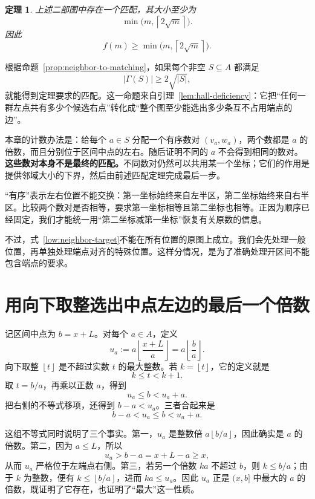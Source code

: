 \documentclass[UTF8,a4paper,oneside,openany,fontset=fandol,zihao=-4]{ctexbook}
\theoremstyle{guide}
\newtheorem{theorem}{定理}[chapter]
\newcommand{\ceil}[1]{\left\lceil#1\right\rceil}
\newcommand{\floor}[1]{\left\lfloor#1\right\rfloor}
\begin{document}
\begin{theorem}\label{low:main}
上述二部图中存在一个匹配，其大小至少为
\[
  \min\bigl(m,\ceil{2\sqrt m}\bigr).
\]
因此
\[
  f(m)\geq\min\bigl(m,\ceil{2\sqrt m}\bigr).
\]
\end{theorem}

根据命题~\ref{prop:neighbor-to-matching}，如果每个非空 $S\subseteq A$ 都满足
\begin{equation}\label{low:neighbor-target}
  |\Gamma(S)|\geq 2\sqrt{|S|},
\end{equation}
就能得到定理要求的匹配。这一命题来自引理~\ref{lem:hall-deficiency}：它把“任何一群左点共有多少个候选右点”转化成“整个图至少能选出多少条互不占用端点的边”。

本章的计数办法是：给每个 $a\in S$ 分配一个有序数对 $(v_a,w_a)$，两个数都是 $a$ 的倍数，而且分别位于区间中点的左右。随后证明不同的 $a$ 不会得到相同的数对。\textbf{这些数对本身不是最终的匹配。}不同数对仍然可以共用某一个坐标；它们的作用是提供邻域大小的下界，然后由前述匹配定理完成最后一步。

“有序”表示左右位置不能交换：第一坐标始终来自左半区，第二坐标始终来自右半区。比较两个数对是否相等，要求第一坐标相等且第二坐标也相等。正因为顺序已经固定，我们才能统一用“第二坐标减第一坐标”恢复有关原数的信息。

不过，式~\eqref{low:neighbor-target}不能在所有位置的原图上成立。我们会先处理一般位置，再单独处理端点对齐的特殊位置。这样分情况，是为了准确处理开区间不能包含端点的要求。

\section{用向下取整选出中点左边的最后一个倍数}

记区间中点为 $b=x+L$。对每个 $a\in A$，定义
\begin{equation}\label{low:floor-choice}
  u_a:=a\floor{\frac{x+L}{a}}=a\floor{\frac ba}.
\end{equation}
向下取整 $\floor t$ 是不超过实数 $t$ 的最大整数。若 $k=\floor t$，它的定义就是
\[
  k\leq t<k+1.
\]
取 $t=b/a$，再乘以正数 $a$，得到
\[
  u_a\leq b<u_a+a.
\]
把右侧的不等式移项，还得到 $b-a<u_a$。三者合起来是
\begin{equation}\label{low:floor-bounds}
  b-a<u_a\leq b<u_a+a.
\end{equation}

这组不等式同时说明了三个事实。第一，$u_a$ 是整数倍 $a\floor{b/a}$，因此确实是 $a$ 的倍数。第二，因为 $a\leq L$，所以
\[
  u_a>b-a=x+L-a\geq x,
\]
从而 $u_a$ 严格位于左端点右侧。第三，若另一个倍数 $ka$ 不超过 $b$，则 $k\leq b/a$；由于 $k$ 为整数，便有 $k\leq\floor{b/a}$，进而 $ka\leq u_a$。因此 $u_a$ 正是 $(x,b]$ 中最大的 $a$ 的倍数，既证明了它存在，也证明了“最大”这一性质。
\end{document}
